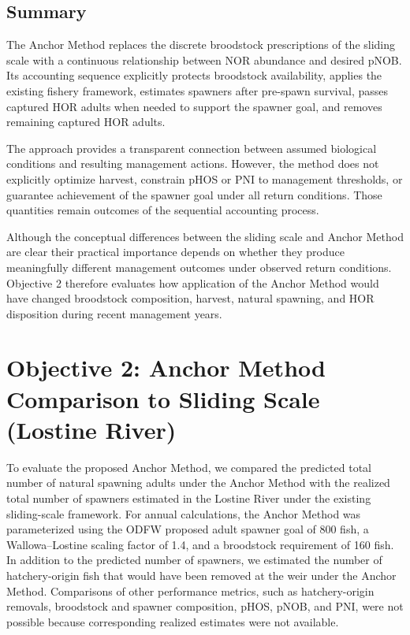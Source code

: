 \documentclass[12pt,letterpaper]{article}
\begin{document}
\subsection{Summary}\label{summary}

The Anchor Method replaces the discrete broodstock prescriptions of the sliding scale with a continuous relationship between NOR abundance and desired pNOB. Its accounting sequence explicitly protects broodstock availability, applies the existing fishery framework, estimates spawners after pre-spawn survival, passes captured HOR adults when needed to support the spawner goal, and removes remaining captured HOR adults.

The approach provides a transparent connection between assumed biological conditions and resulting management actions. However, the method does not explicitly optimize harvest, constrain pHOS or PNI to management thresholds, or guarantee achievement of the spawner goal under all return conditions. Those quantities remain outcomes of the sequential accounting process.

Although the conceptual differences between the sliding scale and Anchor Method are clear their practical importance depends on whether they produce meaningfully different management outcomes under observed return conditions. Objective 2 therefore evaluates how application of the Anchor Method would have changed broodstock composition, harvest, natural spawning, and HOR disposition during recent management years.

\section{Objective 2: Anchor Method Comparison to Sliding Scale (Lostine River)}\label{sec:obj2}

To evaluate the proposed Anchor Method, we compared the predicted total number of natural spawning adults under the Anchor Method with the realized total number of spawners estimated in the Lostine River under the existing sliding-scale framework. For annual calculations, the Anchor Method was parameterized using the ODFW proposed adult spawner goal of 800 fish, a Wallowa--Lostine scaling factor of 1.4, and a broodstock requirement of 160 fish. In addition to the predicted number of spawners, we estimated the number of hatchery-origin fish that would have been removed at the weir under the Anchor Method. Comparisons of other performance metrics, such as hatchery-origin removals, broodstock and spawner composition, pHOS, pNOB, and PNI, were not possible because corresponding realized estimates were not available.
\end{document}
